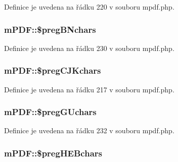 Definice je uvedena na řádku 220 v souboru mpdf.\-php.

\hypertarget{classm_p_d_f_a2f44162e7ffe42defce961bcc0b123bf}{
\subsubsection[{\$preg\-B\-Nchars}]{\setlength{\rightskip}{0pt plus 5cm}m\-P\-D\-F\-::\$preg\-B\-Nchars}}\label{classm_p_d_f_a2f44162e7ffe42defce961bcc0b123bf}


Definice je uvedena na řádku 230 v souboru mpdf.\-php.

\hypertarget{classm_p_d_f_ac612de0a9e3f753e072071b59564060c}{
\subsubsection[{\$preg\-C\-J\-Kchars}]{\setlength{\rightskip}{0pt plus 5cm}m\-P\-D\-F\-::\$preg\-C\-J\-Kchars}}\label{classm_p_d_f_ac612de0a9e3f753e072071b59564060c}


Definice je uvedena na řádku 217 v souboru mpdf.\-php.

\hypertarget{classm_p_d_f_a70f64f140b2fc02e53950923fcff1f91}{
\subsubsection[{\$preg\-G\-Uchars}]{\setlength{\rightskip}{0pt plus 5cm}m\-P\-D\-F\-::\$preg\-G\-Uchars}}\label{classm_p_d_f_a70f64f140b2fc02e53950923fcff1f91}


Definice je uvedena na řádku 232 v souboru mpdf.\-php.

\hypertarget{classm_p_d_f_ac0df801bf2bcd915649927ceb8107a61}{
\subsubsection[{\$preg\-H\-E\-Bchars}]{\setlength{\rightskip}{0pt plus 5cm}m\-P\-D\-F\-::\$preg\-H\-E\-Bchars}}\label{classm_p_d_f_ac0df801bf2bcd915649927ceb8107a61}


